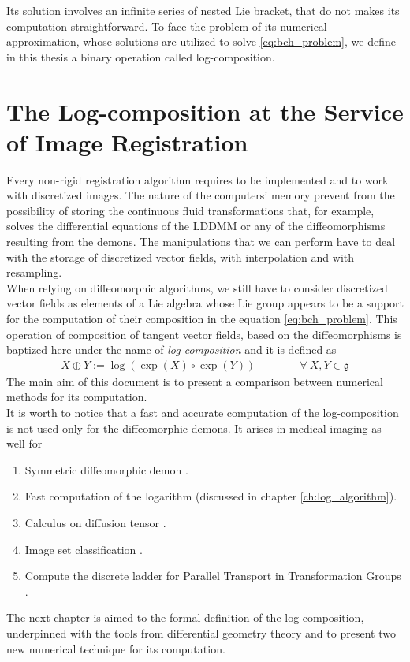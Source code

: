 Its solution involves an infinite series of nested Lie bracket, that do not makes its computation straightforward. 
To face the problem of its numerical approximation, whose solutions are utilized to solve \ref{eq:bch_problem}, we define in this thesis a binary operation called log-composition.


\section{The Log-composition at the Service of Image Registration}

Every non-rigid registration algorithm requires to be implemented and to work with discretized images.
The nature of the computers' memory prevent from the possibility of storing the continuous fluid transformations that, for example, solves the differential equations of the LDDMM or any of the diffeomorphisms resulting from the demons. The manipulations that we can perform have to deal with the storage of discretized vector fields, with interpolation and with resampling.\\

When relying on diffeomorphic algorithms, we still have to consider discretized vector fields as elements of a Lie algebra whose Lie group appears to be a support for the computation of their composition in the equation \ref{eq:bch_problem}.
This operation of composition of tangent vector fields, based on the diffeomorphisms is baptized here under the name of \emph{log-composition} and it is defined as
\begin{align*}
X \oplus Y := \log(\exp(X)\circ\exp( Y))
\qquad \qquad
\forall ~X, Y \in \mathfrak{g}
\end{align*}
The main aim of this document is to present a comparison between numerical methods for its computation. \\

It is worth to notice that a fast and accurate computation of the log-composition is not used only for the diffeomorphic demons. It arises in medical imaging as well for
\begin{enumerate}
	\item Symmetric diffeomorphic demon \cite{vercauteren08}.
	\item Fast computation of the logarithm \cite{Bossa:08} (discussed in chapter \ref{ch:log_algorithm}).
	\item Calculus on diffusion tensor \cite{Arsigny:MRM:06}. 
	\item Image set classification \cite{huanglog}.
	\item Compute the discrete ladder for Parallel Transport in Transformation Groups \cite{Lorenzi:discrete_ladders:14}.
\end{enumerate}	
	
The next chapter is aimed to the formal definition of the log-composition, underpinned with the tools from differential geometry theory and to present two new numerical technique for its computation.


